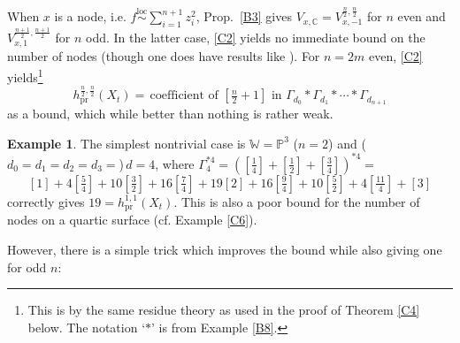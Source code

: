 \documentclass[12pt,letterpaper,english]{amsart}
\numberwithin{equation}{section}
\numberwithin{figure}{section}
\theoremstyle{plain}
\theoremstyle{remark}
\theoremstyle{definition}
\theoremstyle{definition}
\newtheorem{example}[equation]{Example}
\theoremstyle{plain}
\theoremstyle{plain}
\theoremstyle{plain}
\theoremstyle{plain}
\theoremstyle{definition}
\def\CC{\mathbb{C}}
\def\PP{\mathbb{P}}
\def\WW{\mathbb{W}}
\theoremstyle{definition}
\begin{document}
When $x$ is a node, i.e. $f\overset{\text{loc}}{\sim}\sum_{i=1}^{n+1}z_i^2$, Prop.~\ref{B3} gives $V_{x,\CC}=V^{\frac{n}{2},\frac{n}{2}}_{x,-1}$ for $n$ even and $V_{x,1}^{\frac{n+1}{2},\frac{n+1}{2}}$ for $n$ odd.  In the latter case, \eqref{C2} yields no immediate bound on the number of nodes (though one does have results like \cite[Thm.~2.9+Cor~2.11]{KL2}).  For $n=2m$ even, \eqref{C2} yields\footnote{This is by the same residue theory as used in the proof of Theorem \ref{C4} below. The notation `$*$' is from Example \ref{B8}.}
\begin{equation}\label{C3}
h^{\frac{n}{2},\frac{n}{2}}_{\text{pr}}(X_t)=\,\text{coefficient of $[\tfrac{n}{2}+1]$ in $\Gamma_{d_0}*\Gamma_{d_1}*\cdots *\Gamma_{d_{n+1}}$}
\end{equation}
as a bound, which while better than nothing is rather weak.

\begin{example}\label{CE}
The simplest nontrivial case is $\WW=\PP^3$ ($n=2$) and ($d_0=d_1=d_2=d_3=$)$\,d=4$, where $\Gamma_4^{*4}=([\tfrac{1}{4}]+[\tfrac{1}{2}]+[\tfrac{3}{4}])^{*4}=$
\begin{equation}\label{Ce}
[1]+4[\tfrac{5}{4}]+10[\tfrac{3}{2}]+16[\tfrac{7}{4}]+19[2]+16[\tfrac{9}{4}]+10[\tfrac{5}{2}]+4[\tfrac{11}{4}]+[3]
\end{equation}
correctly gives $19=h^{1,1}_{\text{pr}}(X_t)$.  This is also a poor bound for the number of nodes on a quartic surface (cf. Example \ref{C6}).
\end{example}

However, there is a simple trick which improves the bound while also giving one for odd $n$:
\end{document}
